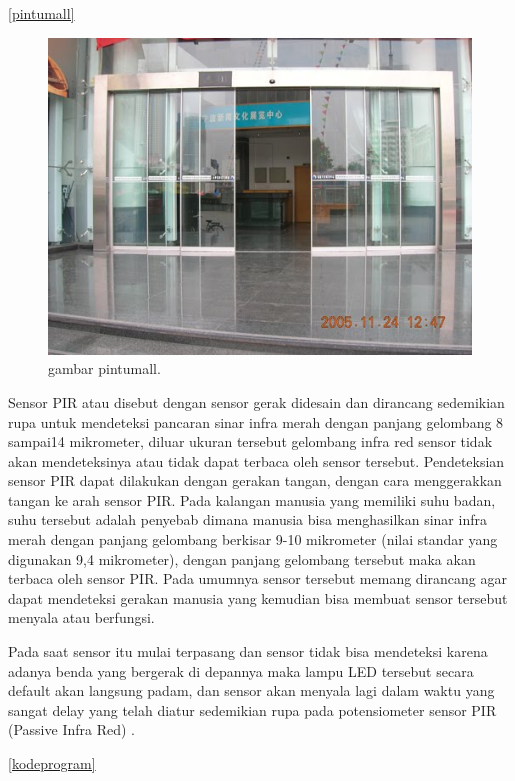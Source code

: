 \documentclass{article}
\begin{document}
\ref{pintumall}

\begin{figure}[ht]
\centerline{\includegraphics[width=1\textwidth]{figures/pintumall.JPG}}
\caption{gambar pintumall.}
\label{pintumall.JPG}
\end{figure}

Sensor PIR atau disebut dengan sensor gerak didesain dan dirancang sedemikian rupa untuk mendeteksi pancaran sinar infra merah dengan panjang gelombang 8 sampai14 mikrometer, diluar ukuran tersebut gelombang infra red sensor tidak akan mendeteksinya atau tidak dapat terbaca oleh sensor tersebut. Pendeteksian sensor PIR  dapat dilakukan dengan gerakan tangan, dengan cara menggerakkan tangan ke arah sensor PIR.
Pada kalangan manusia yang memiliki suhu badan, suhu tersebut adalah penyebab dimana manusia bisa menghasilkan sinar infra merah dengan panjang gelombang berkisar 9-10 mikrometer (nilai standar yang digunakan 9,4 mikrometer), dengan panjang gelombang tersebut maka akan terbaca oleh sensor PIR. Pada umumnya sensor tersebut memang dirancang agar dapat mendeteksi gerakan manusia yang kemudian bisa membuat sensor tersebut menyala atau berfungsi.

Pada saat sensor itu mulai terpasang dan sensor tidak bisa mendeteksi karena adanya benda yang bergerak di depannya maka lampu LED tersebut secara default akan langsung padam, dan sensor akan menyala lagi dalam waktu yang sangat delay yang telah diatur sedemikian rupa pada potensiometer sensor PIR (Passive Infra Red) .

\ref{kodeprogram}
\end{document}
